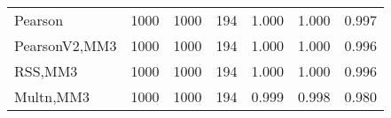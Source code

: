 \documentclass[
]{article}
\begin{document}
\begin{table}[H]
{\begin{tabular}[t]{lrrrrrr}
\hspace{1em}Pearson & 1000 & 1000 & 194 & 1.000 & 1.000 & 0.997\\
\hspace{1em}PearsonV2,MM3 & 1000 & 1000 & 194 & 1.000 & 1.000 & 0.996\\
\hspace{1em}RSS,MM3 & 1000 & 1000 & 194 & 1.000 & 1.000 & 0.996\\
\hspace{1em}Multn,MM3 & 1000 & 1000 & 194 & 0.999 & 0.998 & 0.980\\
\bottomrule
\end{tabular}}
\end{table}
\end{document}
